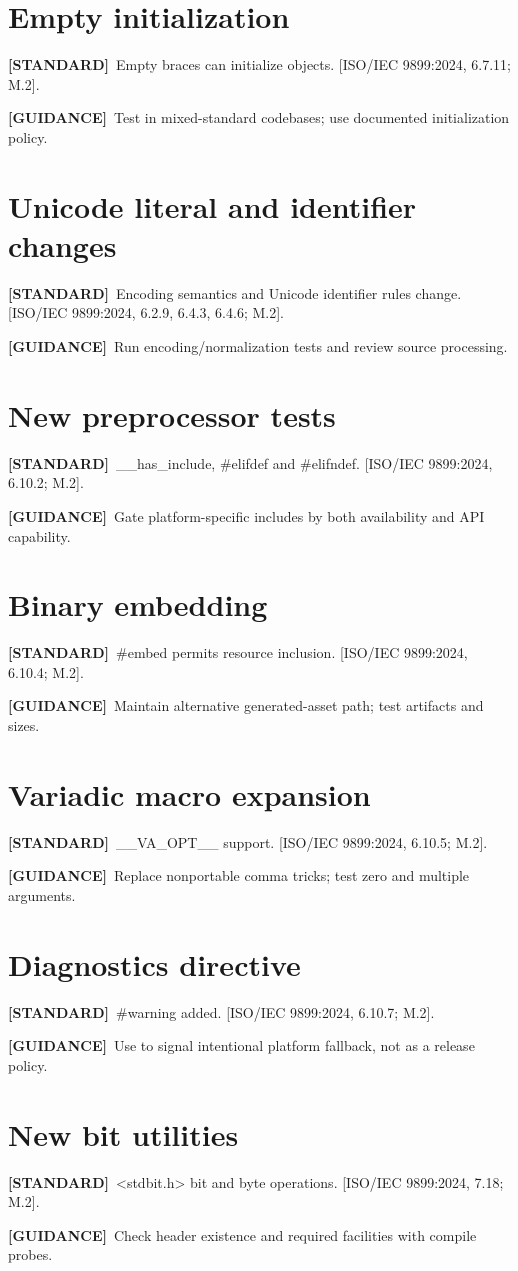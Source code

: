 \documentclass[10pt,letterpaper,oneside]{report}
\newcommand{\refcl}[1]{\textsf{\footnotesize[ISO/IEC 9899:2024, #1]}}
\newcommand{\standard}{\textbf{[STANDARD]}}
\newcommand{\guidance}{\textbf{[GUIDANCE]}}
\begin{document}
\section{Empty initialization}
\standard\ Empty braces can initialize objects. \refcl{6.7.11; M.2}.\par\guidance\ Test in mixed-standard codebases; use documented initialization policy.

\section{Unicode literal and identifier changes}
\standard\ Encoding semantics and Unicode identifier rules change. \refcl{6.2.9, 6.4.3, 6.4.6; M.2}.\par\guidance\ Run encoding/normalization tests and review source processing.

\section{New preprocessor tests}
\standard\ \_\_has\_include, \#elifdef and \#elifndef. \refcl{6.10.2; M.2}.\par\guidance\ Gate platform-specific includes by both availability and API capability.

\section{Binary embedding}
\standard\ \#embed permits resource inclusion. \refcl{6.10.4; M.2}.\par\guidance\ Maintain alternative generated-asset path; test artifacts and sizes.

\section{Variadic macro expansion}
\standard\ \_\_VA\_OPT\_\_ support. \refcl{6.10.5; M.2}.\par\guidance\ Replace nonportable comma tricks; test zero and multiple arguments.

\section{Diagnostics directive}
\standard\ \#warning added. \refcl{6.10.7; M.2}.\par\guidance\ Use to signal intentional platform fallback, not as a release policy.

\section{New bit utilities}
\standard\ <stdbit.h> bit and byte operations. \refcl{7.18; M.2}.\par\guidance\ Check header existence and required facilities with compile probes.
\end{document}
